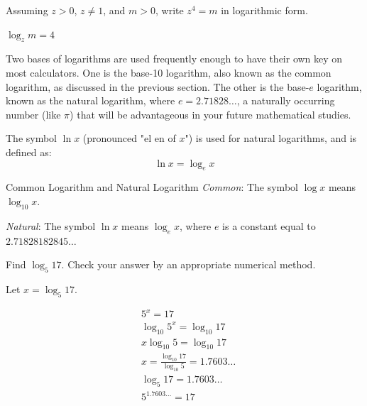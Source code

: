 \begin{example} Assuming $z>0$, $z\neq 1$, and $m>0$, write $z^4=m$ in logarithmic form.

\begin{solution}
    $\log _z m=4$
\end{solution}
    
\end{example}

Two bases of logarithms are used frequently enough to have their own key on most calculators. One is the base-10 logarithm, also known as the common logarithm, as discussed in the previous section. The other is the base-\(e\) logarithm, known as the natural logarithm, where \(e = 2.71828 \ldots\), a naturally occurring number (like \(\pi\)) that will be advantageous in your future mathematical studies.

The symbol \(\ln x\) (pronounced "el en of \(x\)") is used for natural logarithms, and is defined as:
\[
\ln x = \log_e x
\]

\begin{definition}{Common Logarithm and Natural Logarithm}
\hspace{1cm} \textit{Common}: The symbol $\log x$ means $\log _{10} x$.

\hspace{1cm}  \textit{Natural}: \hspace{0.2cm}The symbol $\ln x$ means $\log _e x$, where $e$ is a constant equal to $2.71828182845 \ldots$
\end{definition}

\begin{example}\label{ex:log5-17} Find $\log _5 17$. Check your answer by an appropriate numerical method.

\begin{solution} Let $x=\log _5 17$.

\begin{equation*}
\begin{aligned}
& 5^x=17 \\
& \log _{10} 5^x=\log _{10} 17 \\
& x \log _{10} 5=\log _{10} 17 \\
& x=\frac{\log _{10} 17}{\log _{10} 5}=1.7603 \ldots \\
& \log _5 17=1.7603 \ldots \\
& 5^{1.7603 \ldots}=17
\end{aligned}
\end{equation*}
\end{solution}
\end{example}

